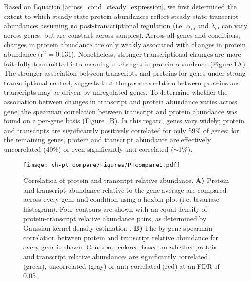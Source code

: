 Based on \hyperref[across_cond_steady_expression]{Equation \ref{across_cond_steady_expression}}, we first determined the extent to which steady-state protein abundances reflect steady-state transcript abundances assuming no post-transcriptional regulation (i.e. $\alpha_{iJ}$ and $\lambda_{iJ}$ can vary across genes, but are constant across samples).  Across all genes and conditions, changes in protein abundance are only weakly associated with changes in protein abundance (r$^{2}$ = 0.131). Nonetheless, stronger transcriptional changes are more faithfully transmitted into meaningful changes in protein abundance (\hyperref[ptscatter]{Figure \ref{ptscatter}A}).  The stronger association between transcripts and proteins for genes under strong transcriptional control, suggests that the poor correlation between proteins and transcripts may be driven by unregulated genes. To determine whether the association between changes in transcript and protein abundance varies across gene, the spearman correlation between transcript and protein abundance was found on a per-gene basis (\hyperref[ptscatter]{Figure \ref{ptscatter}B}). In this regard, genes vary widely; protein and transcripts are significantly positively correlated for only 59\% of genes; for the remaining genes, protein and transcript abundance are effectively uncorrelated (40\%) or even significantly anti-correlated ($\sim$1\%).

\begin{figure}[h!]
\begin{center}
\texttt{[image: ch-pt\_compare/Figures/PTcompare1.pdf]}
\caption[Correlation of protein and transcript relative abundance]{Correlation of protein and transcript relative abundance.  \textbf{A)} Protein and transcript abundance relative to the gene-average are compared across every gene and condition using a hexbin plot (i.e. bivariate histogram).  Four contours are shown with an equal density of protein-transcript relative abundance pairs, as determined by Gaussian kernel density estimation \cite{Anonymous:nXZxIOcv}.  \textbf{B)} The by-gene spearman correlation between protein and transcript relative abundance for every gene is shown.  Genes are colored based on whether protein and transcript relative abundances are significantly correlated (green), uncorrelated (gray) or anti-correlated (red) at an FDR of 0.05.}
\label{ptscatter}
\end{center}
\end{figure}

